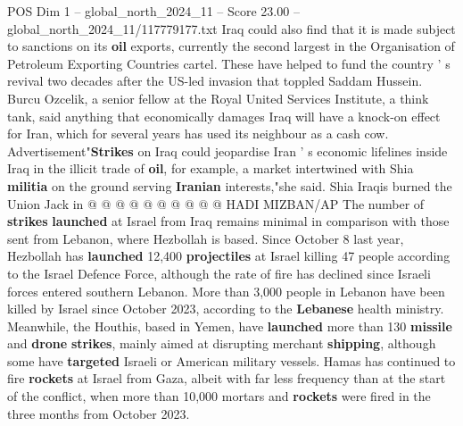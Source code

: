 \begin{textsample}{POS Dim 1 – global\_north\_2024\_11 – Score 23.00 – global\_north\_2024\_11/117779177.txt}
Iraq could also find that it is made subject to sanctions on its \textbf{oil} exports, currently the second largest in the Organisation of Petroleum Exporting Countries cartel.
These have helped to fund the country ' s revival two decades after the US-led invasion that toppled Saddam Hussein.
Burcu Ozcelik, a senior fellow at the Royal United Services Institute, a think tank, said anything that economically damages Iraq will have a knock-on effect for Iran, which for several years has used its neighbour as a cash cow.
Advertisement"\textbf{Strikes} on Iraq could jeopardise Iran ' s economic lifelines inside Iraq in the illicit trade of \textbf{oil}, for example, a market intertwined with Shia \textbf{militia} on the ground serving \textbf{Iranian} interests,"she said.
Shia Iraqis burned the Union Jack in @ @ @ @ @ @ @ @ @ @ HADI MIZBAN/AP The number of \textbf{strikes} \textbf{launched} at Israel from Iraq remains minimal in comparison with those sent from Lebanon, where Hezbollah is based.
Since October 8 last year, Hezbollah has \textbf{launched} 12,400 \textbf{projectiles} at Israel killing 47 people according to the Israel Defence Force, although the rate of fire has declined since Israeli forces entered southern Lebanon.
More than 3,000 people in Lebanon have been killed by Israel since October 2023, according to the \textbf{Lebanese} health ministry.
Meanwhile, the Houthis, based in Yemen, have \textbf{launched} more than 130 \textbf{missile} and \textbf{drone} \textbf{strikes}, mainly aimed at disrupting merchant \textbf{shipping}, although some have \textbf{targeted} Israeli or American military vessels.
Hamas has continued to fire \textbf{rockets} at Israel from Gaza, albeit with far less frequency than at the start of the conflict, when more than 10,000 mortars and \textbf{rockets} were fired in the three months from October 2023.

\end{textsample}
